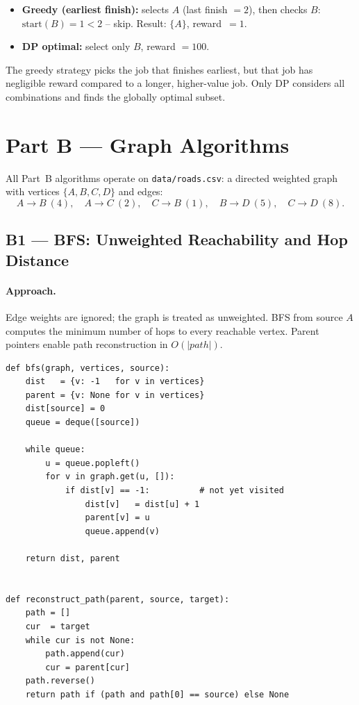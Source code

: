 \documentclass[11pt,a4paper]{article}
\begin{document}
\begin{itemize}[noitemsep]
  \item \textbf{Greedy (earliest finish):} selects $A$ (last finish $= 2$), then checks $B$: $\mathrm{start}(B) = 1 < 2$ -- skip. Result: $\{A\}$, reward~$= 1$.
  \item \textbf{DP optimal:} select only $B$, reward $= 100$.
\end{itemize}

The greedy strategy picks the job that finishes earliest, but that job has negligible reward compared to a longer, higher-value job. Only DP considers all combinations and finds the globally optimal subset.

\section{Part B --- Graph Algorithms}

All Part~B algorithms operate on \texttt{data/roads.csv}: a directed weighted graph with vertices $\{A,B,C,D\}$ and edges:
\[
A\!\to\!B\ (4),\quad A\!\to\!C\ (2),\quad C\!\to\!B\ (1),\quad B\!\to\!D\ (5),\quad C\!\to\!D\ (8).
\]

\subsection{B1 --- BFS: Unweighted Reachability and Hop Distance}

\paragraph{Approach.}  Edge weights are ignored; the graph is treated as unweighted. BFS from source $A$ computes the minimum number of hops to every reachable vertex. Parent pointers enable path reconstruction in $O(|path|)$.

\begin{lstlisting}[style=python, caption={Core BFS logic (src/b1\_bfs.py).}]
def bfs(graph, vertices, source):
    dist   = {v: -1   for v in vertices}
    parent = {v: None for v in vertices}
    dist[source] = 0
    queue = deque([source])

    while queue:
        u = queue.popleft()
        for v in graph.get(u, []):
            if dist[v] == -1:          # not yet visited
                dist[v]   = dist[u] + 1
                parent[v] = u
                queue.append(v)

    return dist, parent


def reconstruct_path(parent, source, target):
    path = []
    cur  = target
    while cur is not None:
        path.append(cur)
        cur = parent[cur]
    path.reverse()
    return path if (path and path[0] == source) else None
\end{lstlisting}
\end{document}
